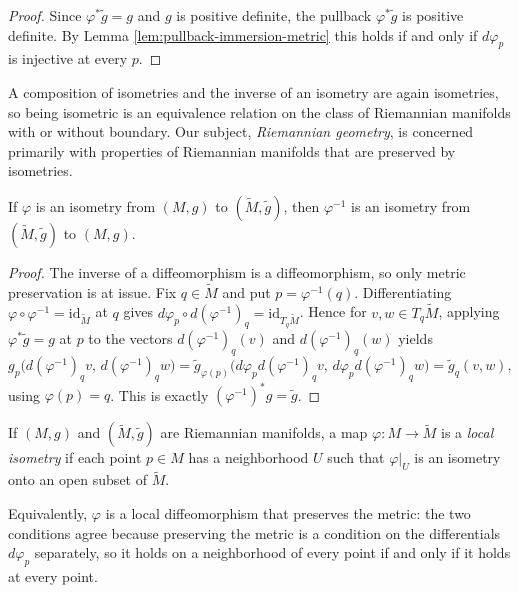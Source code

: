 \begin{proof}
\leanok
{}
Since $\varphi^* \widetilde{g} = g$ and $g$ is positive definite, the pullback $\varphi^* \widetilde{g}$ is positive definite. By Lemma \ref{lem:pullback-immersion-metric} this holds if and only if $d\varphi_p$ is injective at every $p$.
\end{proof}

A composition of isometries and the inverse of an isometry are again isometries, so being isometric is an equivalence relation on the class of Riemannian manifolds with or without boundary. Our subject, \emph{Riemannian geometry}, is concerned primarily with properties of Riemannian manifolds that are preserved by isometries.

\begin{lemma}
\label{lem:isometry-symm}
\leanok
{}
If $\varphi$ is an isometry from $(M,g)$ to $(\widetilde{M}, \widetilde{g})$, then $\varphi^{-1}$ is an isometry from $(\widetilde{M}, \widetilde{g})$ to $(M,g)$.
\end{lemma}

\begin{proof}
\leanok
{}
The inverse of a diffeomorphism is a diffeomorphism, so only metric preservation is at issue. Fix $q \in \widetilde{M}$ and put $p = \varphi^{-1}(q)$. Differentiating $\varphi \circ \varphi^{-1} = \mathrm{id}_{\widetilde{M}}$ at $q$ gives $d\varphi_p \circ d(\varphi^{-1})_q = \mathrm{id}_{T_q \widetilde{M}}$. Hence for $v, w \in T_q\widetilde{M}$, applying $\varphi^* \widetilde{g} = g$ at $p$ to the vectors $d(\varphi^{-1})_q(v)$ and $d(\varphi^{-1})_q(w)$ yields
\[
  g_p\bigl(d(\varphi^{-1})_q v,\, d(\varphi^{-1})_q w\bigr)
  = \widetilde{g}_{\varphi(p)}\bigl(d\varphi_p d(\varphi^{-1})_q v,\, d\varphi_p d(\varphi^{-1})_q w\bigr)
  = \widetilde{g}_q(v, w),
\]
using $\varphi(p) = q$. This is exactly $(\varphi^{-1})^* g = \widetilde{g}$.
\end{proof}

\begin{definition}
\label{def:local-isometry}
\leanok
{}
If $(M, g)$ and $(\widetilde{M}, \widetilde{g})$ are Riemannian manifolds, a map $\varphi: M \to \widetilde{M}$ is a \emph{local isometry} if each point $p \in M$ has a neighborhood $U$ such that $\varphi|_U$ is an isometry onto an open subset of $\widetilde{M}$.

Equivalently, $\varphi$ is a local diffeomorphism that preserves the metric: the two conditions agree because preserving the metric is a condition on the differentials $d\varphi_p$ separately, so it holds on a neighborhood of every point if and only if it holds at every point.
\end{definition}

